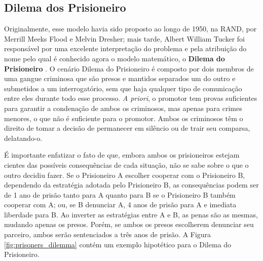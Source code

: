 \subsection{Dilema dos Prisioneiro}
\label{subsec:gan_prisoners_dilemma}

Originalmente, esse modelo havia sido proposto ao longo de 1950, na RAND, por Merrill Meeks Flood e Melvin Dresher; mais tarde, Albert William Tucker foi responsável por uma excelente interpretação do problema e pela atribuição do nome pelo qual é conhecido agora o modelo matemático, o \textbf{Dilema do Prisioneiro} \citep{poundstone1992prisoner}. O cenário Dilema do Prisioneiro é composto por dois membros de uma gangue criminosa que são presos e mantidos separados um do outro e submetidos a um interrogatório, sem que haja qualquer tipo de comunicação entre eles durante todo esse processo. \textit{A priori}, o promotor tem provas suficientes para garantir a condenação de ambos os criminosos, mas apenas para crimes menores, o que não é suficiente para o promotor. Ambos os criminosos têm o direito de tomar a decisão de permanecer em silêncio ou de trair seu comparsa, delatando-o.

É importante enfatizar o fato de que, embora ambos os prisioneiros estejam cientes das possíveis consequências de cada situação, não se sabe sobre o que o outro decidiu fazer. Se o Prisioneiro A escolher cooperar com o Prisioneiro B, dependendo da estratégia adotada pelo Prisioneiro B, as consequências podem ser de 1 ano de prisão tanto para A quanto para B se o Prisioneiro B também cooperar com A; ou, se B denunciar A, 4 anos de prisão para A e imediata liberdade para B. Ao inverter as estratégias entre A e B, as penas são as mesmas, mudando apenas os presos. Porém, se ambos os presos escolherem denunciar seu parceiro, ambos serão sentenciados a três anos de prisão. A Figura \ref{fig:prisoners_dilemma} contém um exemplo hipotético para o Dilema do Prisioneiro.

